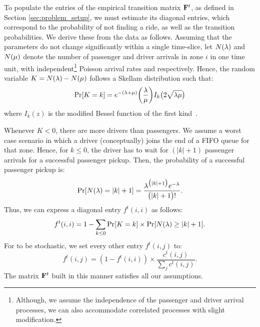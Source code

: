 To populate the entries of the empirical transition matrix ${\mathbf{F}}^t$, as 
  defined in Section \ref{sec:problem_setup}, we must estimate its diagonal entries, 
  which correspond to the probability of not finding a ride, as well as the transition probabilities.
We derive these from the data as follows.
Assuming that the parameters do not change significantly within a single time-slice, let $N(\lambda)$ and $N(\mu)$ denote the number of passenger and driver arrivals in zone $i$ in one time unit, with 
independent\footnote{Although, we assume the independence of the passenger and driver arrival processes, we can also accommodate correlated processes with slight modification.} Poisson arrival rates {\passengerarrivalrate} and {\driverarrivalrate} respectively. Hence, the random variable $K = N(\lambda) - N(\mu)$ follows a Skellam distribution
such that:
\begin{equation*}
\Pr[K=k] = e^{-(\lambda + \mu)} \bigg(\frac{\lambda}{\mu}\bigg) I_k\big(2 \sqrt{\lambda \mu}\big)
\end{equation*}
where $I_k(z)$ is the modified Bessel function of the first kind~\cite{wiki:skellam}. 

Whenever %
$K<0$, there are more drivers than passengers. We assume a worst case scenario in which a driver (conceptually) joins the end
 of a FIFO queue for that zone. Hence, for $k \leq 0$, the driver has to wait for $(|k| + 1)$ passenger arrivals for a successful passenger pickup. Then, the probability of a successful passenger pickup is:
\begin{equation*}
\Pr[N(\lambda) = |k| + 1] = \frac{\lambda^{\big(|k|+1\big)} e^{-\lambda}}{\big(|k| + 1\big)!}.
\end{equation*}
Thus, we can express a diagonal entry $f^t(i,i)$ as follows:
\begin{equation*}
f^t(i,i) = 1 - \sum_{k \leq 0} \Pr[K = k] \times \Pr[N(\lambda) \geq |k| + 1].
\end{equation*}
For {\empiricaltransitionmatrix} to be stochastic, we set every other entry 
$f^t(i,j)$ to:
\begin{equation*}
f^t(i,j) = (1 - f^t(i,i)) \times \frac{c^t(i,j)}{\sum_{j}c^t(i,j)}. 
\end{equation*}
The matrix ${\mathbf{F}}^t$ built in this manner satisfies all our assumptions. %

